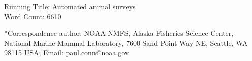 \documentclass[12pt,fleqn]{article}
\begin{document}
\rm \begin{flushleft}
\vspace{30mm}
Running Title: Automated animal surveys \\
\vspace{10mm}
Word Count: 6610

\vspace{80mm}

\setlength{\textheight}{575pt}
\setlength{\baselineskip}{12pt}


*Correspondence author: NOAA-NMFS, Alaska Fisheries Science Center, National Marine Mammal Laboratory, 7600 Sand Point Way NE, Seattle, WA 98115 USA;
Email: paul.conn@noaa.gov


\normalsize\newpage
\setlength{\baselineskip}{24pt}


\end{flushleft}
\end{document}

